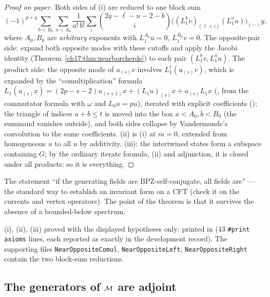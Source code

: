 \begin{proof}[Proof on paper]
Both sides of (i) are reduced to one block sum
\begin{equation*}
(-1)^{p+q}\sum_{b<B_0}\sum_{a<A_0}\frac1{a!\,b!}\sum_i\binom{2q-\ell-n-2-b}{i}\bigl((L_1^bv)_{(\ell+i)}(L_1^au)\bigr)_{(\cdots)}y,
\end{equation*}
where $A_0,B_0$ are \emph{arbitrary} exponents with $L_1^{A_0}u=0$, $L_1^{B_0}v=0$.  The opposite-pair side: expand both opposite
modes with these cutoffs and apply the Jacobi identity (Theorem~\ref{ch17:thm:nearborcherds}) to each pair
$(L_1^bv,L_1^au)$.  The product side: the opposite mode of $u_{(s)}v$ involves $L_1^t(u_{(s)}v)$, which is expanded by the
``comultiplication'' formula $L_1(u_{(s)}x)=(2p-s-2)u_{(s+1)}x+(L_1u)_{(s)}x+u_{(s)}L_1x$ (,
from the commutator formula with $\omega$ and $L_0u=pu$), iterated with explicit coefficients ();
the triangle of indices $a+b\le t$ is moved into the box $a<A_0,b<B_0$ (the summand vanishes outside), and both sides
collapse by Vandermonde's convolution to the same coefficients.  (ii) is (i) at $m=0$, extended from homogeneous $u$ to
all $u$ by additivity.  (iii): the intertwined states form a subspace containing $G$; by the ordinary iterate formula, (ii)
and adjunction, it is closed under all products; so it is everything.
\end{proof}

\begin{physics}
The statement ``if the generating fields are BPZ-self-conjugate, all fields are'' --- the standard way to establish an
invariant form on a CFT (check it on the currents and vertex operators).  The point of the theorem is that it survives
the absence of a bounded-below spectrum.
\end{physics}

\begin{status}
(i), (ii), (iii) proved with the displayed hypotheses only; printed in 
(43 \texttt{\#print axioms} lines, each reported as exactly  in the development record).  The
supporting files \texttt{NearOppositeComul}, \texttt{NearOppositeLeft}, \texttt{NearOppositeRight} contain the two
block-sum reductions.
\end{status}

\subsection{The generators of \texorpdfstring{$\mathcal{M}$}{M} are adjoint}

